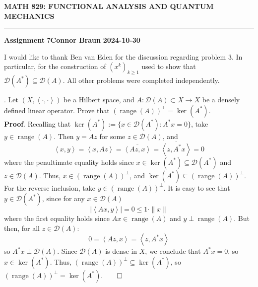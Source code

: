 \documentclass[10pt]{article}
\newcommand{\1}[1]{\mathbbm{1}_{#1}} \newcommand{\mc}[1]{\mathcal{#1}}
\newcommand{\ip}[2]{\left\langle#1,#2\right\rangle }
\DeclareMathOperator{\ran}{range}
\begin{document}
    \begin{center}
        {\bf\large{MATH 829: FUNCTIONAL ANALYSIS AND QUANTUM MECHANICS}}
        \smallskip
        \hrule
        \smallskip
        {\bf Assignment} 7\hfill {\bf Connor Braun} \hfill {\bf 2024-10-30}
    \end{center}
    \vspace{5pt}
    \begin{center}
        \begin{minipage}{\dimexpr\paperwidth-10cm}
            I would like to thank Ben van Eden for the discussion regarding problem 3. In particular, for the construction of $(x^k)_{k\geq 1}$ 
            used to show that $\mc{D}(A^\ast)\subseteq\mc{D}(A)$. All other problems were completed independently.
        \end{minipage}
    \end{center}
    . Let $(X,\ip{\cdot}{\cdot})$ be a Hilbert space, and
    $A:\mc{D}(A)\subset X\rightarrow X$ be a densely defined linear operator.
    Prove that $(\ran(A))^\perp=\ker(A^\ast)$.\\[5pt]
    {\bf Proof}. Recalling that $\ker(A^\ast):=\{x\in\mc{D}(A^\ast):A^\ast
    x=0\}$, take $y\in\ran(A)$. Then $y=Az$ for some $z\in\mc{D}(A)$, and
    \[\ip{x}{y}=\ip{x}{Az}=\overline{\ip{Az}{x}}=\overline{\ip{z}{A^\ast x}}=0\]
    where the penultimate equality holds since $x\in\ker(A^\ast)\subseteq
    \mc{D}(A^\ast)$ and $z\in\mc{D}(A)$. Thus, $x\in(\ran(A))^\perp$, and
    $\ker(A^\ast)\subseteq(\ran(A))^\perp$. For the reverse inclusion, take
    $y\in(\ran(A))^\perp$. It is easy to see that $y\in\mc{D}(A^\ast)$, since
    for any $x\in\mc{D}(A)$
    \[|\ip{Ax}{y}|=0\leq 1\cdot\|x\|\] where the first equality
    holds since $Ax\in\ran(A)$ and $y\perp\ran(A)$. But then, for all
    $z\in\mc{D}(A)$:
    \[0=\ip{Az}{x}=\ip{z}{A^\ast x}\] so $A^\ast x\perp\mc{D}(A)$. Since
    $\mc{D}(A)$ is dense in $X$, we conclude that $A^\ast x=0$, so
    $x\in\ker(A^\ast)$. Thus, $(\ran(A))^\perp\subseteq\ker(A^\ast)$, so
    $(\ran(A))^\perp=\ker(A^\ast)$.\hfill{$\qed$}\\[5pt]
\end{document}
